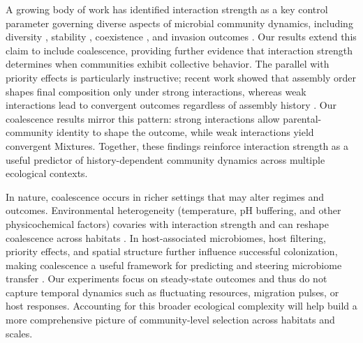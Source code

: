 A growing body of work has identified interaction strength as a key control parameter governing diverse aspects of microbial community dynamics, including diversity \citep{Hu2022, Marsland2019}, stability \citep{Allesina2012, Ratzke2020}, coexistence \citep{Grilli2017}, and invasion outcomes \citep{Hu2025, Kurkjian2021}. Our results extend this claim to include coalescence, providing further evidence that interaction strength determines when communities exhibit collective behavior.  The parallel with priority effects is particularly instructive; recent work showed that assembly order shapes final composition only under strong interactions, whereas weak interactions lead to convergent outcomes regardless of assembly history \citep{Hu2025, Fukami2015}. Our coalescence results mirror this pattern: strong interactions allow parental-community identity to shape the outcome, while weak interactions yield convergent Mixtures. Together, these findings reinforce interaction strength as a useful predictor of history-dependent community dynamics across multiple ecological contexts.


 In nature, coalescence occurs in richer settings that may alter regimes and outcomes. Environmental heterogeneity (temperature, pH buffering, and other physicochemical factors) covaries with interaction strength and can reshape coalescence across habitats \citep{Rillig2015, Castledine2020, Rillig2017, Tropini2017}. In host-associated microbiomes, host filtering, priority effects, and spatial structure further influence successful colonization, making coalescence a useful framework for predicting and steering microbiome transfer \citep{Liu2024, Smillie2018, Rocca2021}. Our experiments focus on steady-state outcomes and thus do not capture temporal dynamics such as fluctuating resources, migration pulses, or host responses. Accounting for this broader ecological complexity will help build a more comprehensive picture of community-level selection across habitats and scales.
